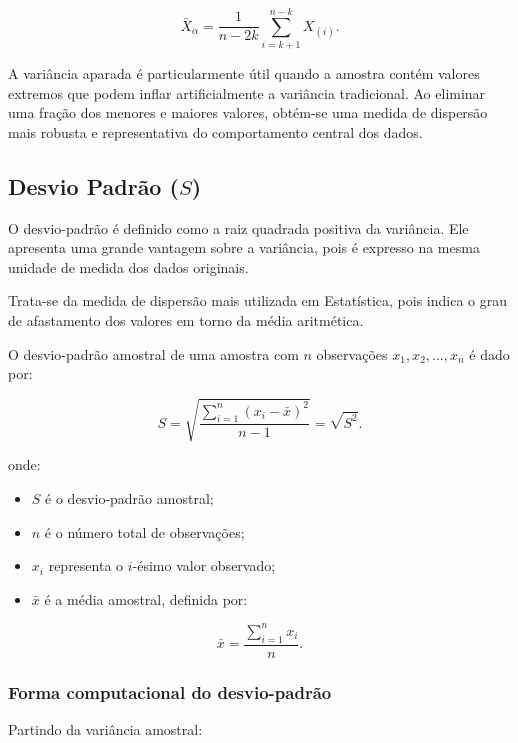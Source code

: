 \begin{equation}\label{eq:media_aparada}
\bar{X}_{\alpha}
=
\frac{1}{n-2k}
\sum_{i=k+1}^{n-k}X_{(i)}.
\end{equation}

A variância aparada é particularmente útil quando a amostra contém valores
extremos que podem inflar artificialmente a variância tradicional.
Ao eliminar uma fração dos menores e maiores valores, obtém-se uma medida de
dispersão mais robusta e representativa do comportamento central dos dados.

\newpage
\subsection{Desvio Padrão ($S$)}

O desvio-padrão é definido como a raiz quadrada positiva da variância. 
Ele apresenta uma grande vantagem sobre a variância, pois é expresso na 
mesma unidade de medida dos dados originais.\vskip0.3cm

Trata-se da medida de dispersão mais utilizada em Estatística, pois indica 
o grau de afastamento dos valores em torno da média aritmética.\vskip0.3cm

O desvio-padrão amostral de uma amostra com $n$ observações 
$x_{1},x_{2},\ldots,x_{n}$ é dado por:

\begin{equation}\label{eq:dp_bruto}
S=\sqrt{\frac{\sum_{i=1}^{n}(x_i-\bar{x})^{2}}{n-1}}
=\sqrt{S^{2}}.
\end{equation}

onde:
\begin{itemize}
    \item $S$ é o desvio-padrão amostral;
    \item $n$ é o número total de observações;
    \item $x_i$ representa o $i$-ésimo valor observado;
    \item $\bar{x}$ é a média amostral, definida por:
\end{itemize}

\begin{equation}\label{eq:media}
\bar{x}=\frac{\sum_{i=1}^{n}x_i}{n}.
\end{equation}


\subsubsection*{Forma computacional do desvio-padrão}
Partindo da variância amostral:

